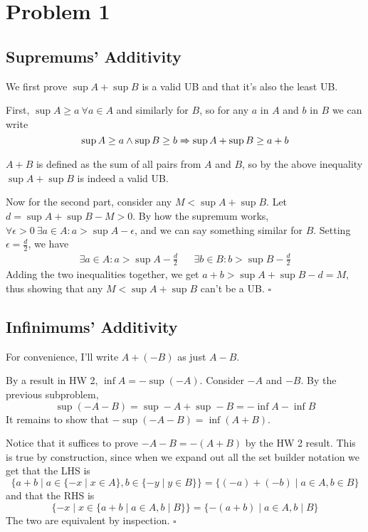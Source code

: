 \documentclass[12pt]{article}
\newcommand{\ra}{\xRightarrow}
\begin{document}
\section{Problem 1} \label{sec:prob1}

\subsection{Supremums' Additivity}

We first prove $\sup A + \sup B$ is a valid UB and that it's also the least UB.

First, $\sup A \ge a\ \forall a \in A$ and similarly for $B$,
so for any $a$ in $A$ and $b$ in $B$ we can write
\[\sup A \ge a \land \sup B \ge b \ra{} \sup A + \sup B \ge a + b\]
$A+B$ is defined as the sum of all pairs from $A$ and $B$,
so by the above inequality $\sup A + \sup B$ is indeed a valid UB.

Now for the second part, consider any $M < \sup A + \sup B$.
Let $d=\sup A + \sup B - M > 0$.
By how the supremum works, $\forall \epsilon > 0\ \exists a \in A: a > \sup A - \epsilon$,
and we can say something similar for $B$.
Setting $\epsilon=\frac{d}{2}$, we have
\begin{align*}
  \exists a \in A: a > \sup A - \frac{d}{2} &  &
  \exists b \in B: b > \sup B - \frac{d}{2}
\end{align*}
Adding the two inequalities together, we get $a+b>\sup A + \sup B-d=M$,
thus showing that any $M < \sup A + \sup B$ can't be a UB. $\square$

\subsection{Infinimums' Additivity}

For convenience, I'll write $A + (-B)$ as just $A-B$.

By a result in HW 2, $\inf A = -\sup(-A)$.
Consider $-A$ and $-B$.
By the previous subproblem,
\[\sup (-A -B)=\sup -A + \sup -B=-\inf A - \inf B\]
It remains to show that $-\sup (-A-B)=\inf (A+B)$.

Notice that it suffices to prove $-A-B=-(A+B)$ by the HW 2 result.
This is true by construction, since
when we expand out all the set builder notation we get that the LHS is
\[\{a+b \mid a \in \{-x \mid x \in A\}, b \in \{-y \mid y \in B\}\}
  = \{(-a)+(-b) \mid a \in A, b \in B\}\]
and that the RHS is
\[\{-x \mid x \in \{a+b \mid a \in A, b \mid B\}\}=\{-(a+b) \mid a \in A, b \mid B\}\]
The two are equivalent by inspection. $\square$
\end{document}
